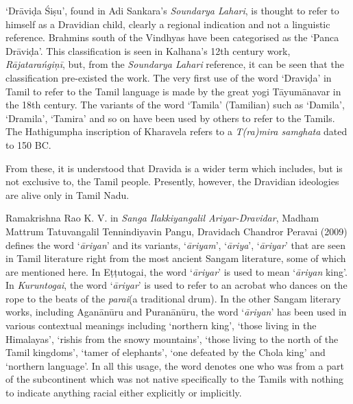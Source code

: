‘Drāviḍa Śiṣu’, found in Adi Sankara’s \textit{Soundarya Lahari}, is thought to refer to himself as a Dravidian child, clearly a regional indication and not a linguistic reference. Brahmins south of the Vindhyas have been categorised as the ‘Panca Drāviḍa’. This classification is seen in Kalhana’s 12th century work, \textit{Rājatarańgiņī}, but, from the \textit{Soundarya Lahari} reference, it can be seen that the classification pre-existed the work. The very first use of the word ‘Draviḍa’ in Tamil to refer to the Tamil language is made by the great yogi Tāyumānavar in the 18th century. The variants of the word ‘Tamila’ (Tamilian) such as ‘Damila’, ‘Dramila’, ‘Tamira’ and so on have been used by others to refer to the Tamils. The Hathigumpha inscription of Kharavela refers to a \textit{T(ra)mira samghata} dated to 150 BC.

From these, it is understood that Dravida is a wider term which includes, but is not exclusive to, the Tamil people. Presently, however, the Dravidian ideologies are alive only in Tamil Nadu.

Ramakrishna Rao K. V. in \textit{Sanga Ilakkiyangalil Ariyar-Dravidar}, Madham Mattrum Tatuvangalil Tennindiyavin Pangu, Dravidach Chandror Peravai (2009) defines the word ‘\textit{āriyan}’ and its variants, ‘\textit{āriyam}’, ‘\textit{āriya}’, ‘\textit{āriyar}’ that are seen in Tamil literature right from the most ancient Sangam literature, some of which are mentioned here. In Eṭṭutogai, the word ‘\textit{āriyar}’ is used to mean ‘\textit{āriyan} king’. In \textit{Kuruntogai}, the word ‘\textit{āriyar}’ is used to refer to an acrobat who dances on the rope to the beats of the \textit{parai}(a traditional drum). In the other Sangam literary works, including Aganānūru and Puranānūru, the word ‘\textit{āriyan}’ has been used in various contextual meanings including ‘northern king’, ‘those living in the Himalayas’, ‘rishis from the snowy mountains’, ‘those living to the north of the Tamil kingdoms’, ‘tamer of elephants’, ‘one defeated by the Chola king’ and ‘northern language’. In all this usage, the word denotes one who was from a part of the subcontinent which was not native specifically to the Tamils with nothing to indicate anything racial either explicitly or implicitly.


